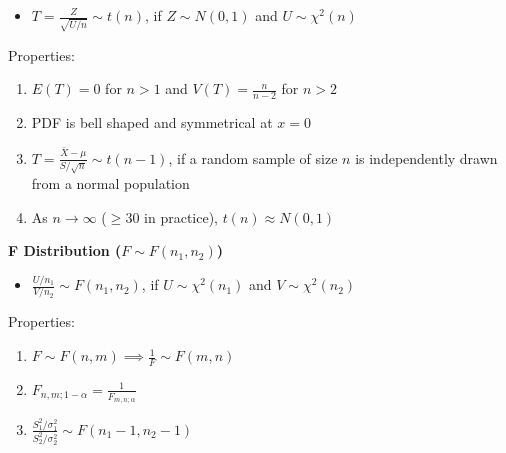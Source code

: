 \documentclass[a4paper, 12pt]{article}
\begin{document}
\begin{multicols*}{4}
\begin{itemize}
    \item $T=\frac{Z}{\sqrt{U/n}} \sim t(n)$, if $Z \sim N(0,1)$ and $U \sim \chi^2(n)$
\end{itemize}
Properties:
\begin{enumerate}
    \item $E(T) = 0$ for $n > 1$ and $V(T) = \frac{n}{n-2}$ for $n > 2$
    \item PDF is bell shaped and symmetrical at $x=0$
    \item $T = \frac{\bar{X}-\mu}{S/\sqrt{n}} \sim t(n-1)$, if a random sample of size $n$ is independently drawn from a normal population
    \item As $n\rightarrow\infty$ ($\geq 30$ in practice), $t(n) \approx N(0,1)$
\end{enumerate}
\textbf{F Distribution ($F \sim F(n_1,n_2)$)}
\begin{itemize}
    \item $\frac{U/n_1}{V/n_2} \sim F(n_1,n_2)$, if $U \sim \chi^2(n_1)$ and $V \sim \chi^2(n_2)$
\end{itemize}
Properties:
\begin{enumerate}
    \item $F \sim F(n,m) \implies \frac{1}{F} \sim F(m,n)$
    \item $F_{n,m;1-\alpha} = \frac{1}{F_{m,n;\alpha}}$
    \item $\frac{S_1^2/\sigma_1^2}{S_2^2/\sigma_2^2} \sim F(n_1-1,n_2-1)$
\end{enumerate}

\medskip


\end{multicols*}
\end{document}
